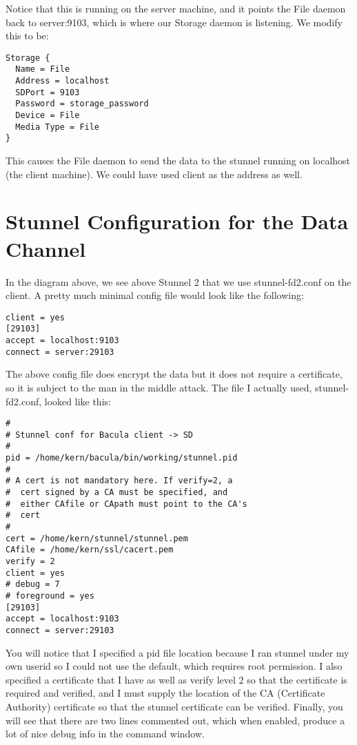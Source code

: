 Notice that this is running on the server machine, and it points the File
daemon back to server:9103, which is where our Storage daemon is listening. We
modify this to be:

\footnotesize
\begin{verbatim}
Storage {
  Name = File
  Address = localhost
  SDPort = 9103
  Password = storage_password
  Device = File
  Media Type = File
}
\end{verbatim}
\normalsize

This causes the File daemon to send the data to the stunnel running on
localhost (the client machine). We could have used client as the address as
well.

\section{Stunnel Configuration for the Data Channel}

In the diagram above, we see above Stunnel 2 that we use stunnel-fd2.conf on the
client. A pretty much minimal config file would look like the following:

\footnotesize
\begin{verbatim}
client = yes
[29103]
accept = localhost:9103
connect = server:29103
\end{verbatim}
\normalsize

The above config file does encrypt the data but it does not require a
certificate, so it is subject to the man in the middle attack. The file I
actually used, stunnel-fd2.conf, looked like this:

\footnotesize
\begin{verbatim}
#
# Stunnel conf for Bacula client -> SD
#
pid = /home/kern/bacula/bin/working/stunnel.pid
#
# A cert is not mandatory here. If verify=2, a
#  cert signed by a CA must be specified, and
#  either CAfile or CApath must point to the CA's
#  cert
#
cert = /home/kern/stunnel/stunnel.pem
CAfile = /home/kern/ssl/cacert.pem
verify = 2
client = yes
# debug = 7
# foreground = yes
[29103]
accept = localhost:9103
connect = server:29103
\end{verbatim}
\normalsize

You will notice that I specified a pid file location because I ran stunnel
under my own userid so I could not use the default, which requires root
permission. I also specified a certificate that I have as well as verify level
2 so that the certificate is required and verified, and I must supply the
location of the CA (Certificate Authority) certificate so that the stunnel
certificate can be verified. Finally, you will see that there are two lines
commented out, which when enabled, produce a lot of nice debug info in the
command window.


